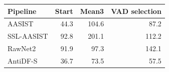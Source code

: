 \begin{tabular}{@{}lrrr@{}}
\toprule
Pipeline & Start & Mean3 & VAD selection \\
\midrule
AASIST & 44.3 & 104.6 & 87.2 \\
SSL-AASIST & 92.8 & 201.1 & 112.2 \\
RawNet2 & 91.9 & 97.3 & 142.1 \\
AntiDF-S & 36.7 & 73.5 & 57.5 \\
\bottomrule
\end{tabular}
